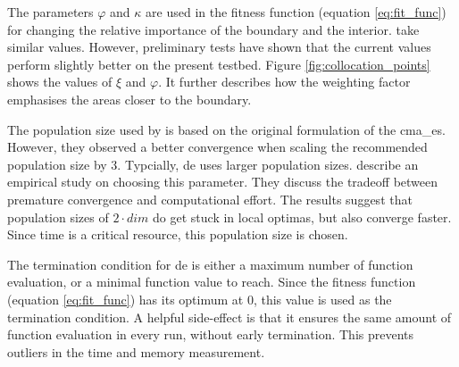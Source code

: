 \documentclass[./\jobname.tex]{subfiles}
\begin{document}
The parameters $\varphi$ and $\kappa$ are used in the fitness function (equation \ref{eq:fit_func}) for changing the relative importance of the boundary and the interior. \cite{chaquet_using_2019} take similar values. However, preliminary tests have shown that the current values perform slightly better on the present testbed. Figure \ref{fig:collocation_points} shows the values of $\xi$ and $\varphi$. It further describes how the weighting factor emphasises the areas closer to the boundary. 

\begin{figure}[h]
	\centering
	\noindent{}
	\label{fig:collocation_weight}
\end{figure}

The population size used by \cite{chaquet_using_2019} is based on the original formulation of the \gls{cma_es}. However, they observed a better convergence when scaling the recommended population size by 3. Typcially, \gls{de} uses larger population sizes. \cite{mallipeddi_empirical_2008} describe an empirical study on choosing this parameter. They discuss the tradeoff between premature convergence and computational effort. The results suggest that population sizes of $2\cdot dim$ do get stuck in local optimas, but also converge faster. Since time is a critical resource, this population size is chosen. 

The termination condition for \gls{de} is either a maximum number of function evaluation, or a minimal function value to reach. Since the fitness function (equation \ref{eq:fit_func}) has its optimum at 0, this value is used as the termination condition. A helpful side-effect is that it ensures the same amount of function evaluation in every run, without early termination. This prevents outliers in the time and memory measurement. 
\end{document}
